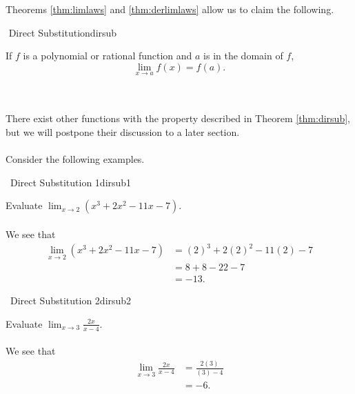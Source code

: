         \vphantom
        \\
        \\
        Theorems \ref{thm:limlaws} and \ref{thm:derlimlaws} allow us to claim the following.
        \begin{theorem}{\Stop\,\,Direct Substitution}{dirsub}

            If \(f\) is a polynomial or rational function and \(a\) is in the domain of \(f\),
            \begin{equation*}
                \lim_{x\to a}f(x)=f(a).
            \end{equation*}
            
        \end{theorem}
        \vphantom
        \\
        \\
        There exist other functions with the property described in Theorem \ref{thm:dirsub}, but we will postpone their discussion to a later section.
        \pagebreak
        \\
        \\
        Consider the following examples.
        \begin{example}{\Difficulty\,\Difficulty\,\,Direct Substitution 1}{dirsub1}

            Evaluate \(\lim_{x \to 2}(x^3+2x^2-11x-7)\).
            \\
            \\
            We see that
            \begin{align*}
                \lim_{x \to 2}(x^3+2x^2-11x-7)&=(2)^3+2(2)^2-11(2)-7 \\
                &=8+8-22-7 \\
                &=-13.
            \end{align*}

        \end{example}
        \begin{example}{\Difficulty\,\Difficulty\,\,Direct Substitution 2}{dirsub2}
            
            Evaluate \(\lim_{x \to 3}\frac{2x}{x-4}\).
            \\
            \\
            We see that
            \begin{align*}
                \lim_{x \to 3}\frac{2x}{x-4}&=\frac{2(3)}{(3)-4} \\
                &=-6.
            \end{align*}

        \end{example}
